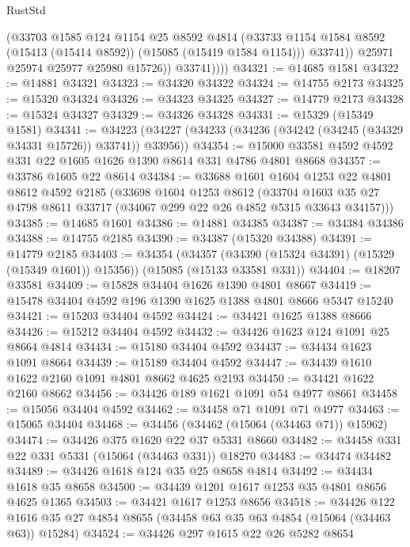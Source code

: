 \begin{lexlean}{RustStd}
\begin{coremodule}
                  (@33703
                    @1585
                    @124
                    @1154
                    @25
                    @8592
                    @4814
                    (@33733 @1154 @1584 @8592 (@15413 (@15414 @8592)) (@15085 (@15419 @1584 @1154)))
                    @33741))
                @25971
                @25974
                @25977
                @25980
                @15726))
            @33741))))
@34321 := @14685 @1581
@34322 := @14881 @34321
@34323 := @34320 @34322
@34324 := @14755 @2173
@34325 := @15320 @34324
@34326 := @34323 @34325
@34327 := @14779 @2173
@34328 := @15324 @34327
@34329 := @34326 @34328
@34331 := @15329 (@15349 @1581)
@34341 := @34223 (@34227 (@34233 (@34236 (@34242 (@34245 (@34329 @34331 @15726)) @33741)) @33956))
@34354 := @15000 @33581 @4592 @4592 @331 @22 @1605 @1626 @1390 @8614 @331 @4786 @4801 @8668
@34357 := @33786 @1605 @22 @8614
@34384 := @33688
    @1601
    @1604
    @1253
    @22
    @4801
    @8612
    @4592
    @2185
    (@33698
      @1604
      @1253
      @8612
      (@33704 @1603 @35 @27 @4798 @8611 @33717 (@34067 @299 @22 @26 @4852 @5315 @33643 @34157)))
@34385 := @14685 @1601
@34386 := @14881 @34385
@34387 := @34384 @34386
@34388 := @14755 @2185
@34390 := @34387 (@15320 @34388)
@34391 := @14779 @2185
@34403 := @34354
    (@34357 (@34390 (@15324 @34391) (@15329 (@15349 @1601)) @15356))
    (@15085 (@15133 @33581 @331))
@34404 := @18207 @33581
@34409 := @15828 @34404 @1626 @1390 @4801 @8667
@34419 := @15478 @34404 @4592 @196 @1390 @1625 @1388 @4801 @8666 @5347 @15240
@34421 := @15203 @34404 @4592
@34424 := @34421 @1625 @1388 @8666
@34426 := @15212 @34404 @4592
@34432 := @34426 @1623 @124 @1091 @25 @8664 @4814
@34434 := @15180 @34404 @4592
@34437 := @34434 @1623 @1091 @8664
@34439 := @15189 @34404 @4592
@34447 := @34439 @1610 @1622 @2160 @1091 @4801 @8662 @4625 @2193
@34450 := @34421 @1622 @2160 @8662
@34456 := @34426 @189 @1621 @1091 @54 @4977 @8661
@34458 := @15056 @34404 @4592
@34462 := @34458 @71 @1091 @71 @4977
@34463 := @15065 @34404
@34468 := @34456 (@34462 (@15064 (@34463 @71)) @15962)
@34474 := @34426 @375 @1620 @22 @37 @5331 @8660
@34482 := @34458 @331 @22 @331 @5331 (@15064 (@34463 @331)) @18270
@34483 := @34474 @34482
@34489 := @34426 @1618 @124 @35 @25 @8658 @4814
@34492 := @34434 @1618 @35 @8658
@34500 := @34439 @1201 @1617 @1253 @35 @4801 @8656 @4625 @1365
@34503 := @34421 @1617 @1253 @8656
@34518 := @34426
    @122
    @1616
    @35
    @27
    @4854
    @8655
    (@34458 @63 @35 @63 @4854 (@15064 (@34463 @63)) @15284)
@34524 := @34426 @297 @1615 @22 @26 @5282 @8654

\end{coremodule}
\end{lexlean}
